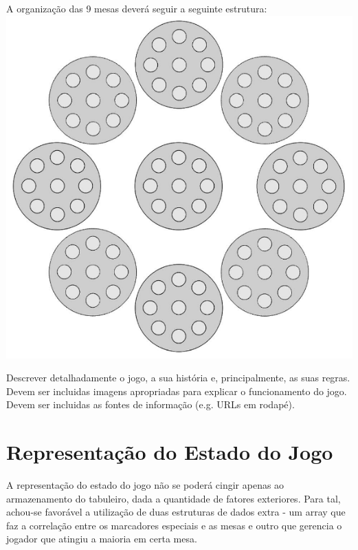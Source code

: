 \documentclass[a4paper]{article}
\begin{document}
A organização das 9 mesas deverá seguir a seguinte estrutura: \newline \newline
\includegraphics[scale=0.5]{board-setup.png}\linebreak\linebreak

Descrever detalhadamente o jogo, a sua história e, principalmente, as suas regras.
Devem ser incluidas imagens apropriadas para explicar o funcionamento do jogo.
Devem ser incluidas as fontes de informação (e.g. URLs em rodapé).


\section{Representação do Estado do Jogo}

A representação do estado do jogo não se poderá cingir apenas ao armazenamento do tabuleiro, dada a quantidade de fatores exteriores. \newline
Para tal, achou-se favorável a utilização de duas estruturas de dados extra - um array que faz a correlação entre os marcadores especiais e as mesas e outro que gerencia o jogador que atingiu a maioria em certa mesa. \newline \newline
\end{document}
